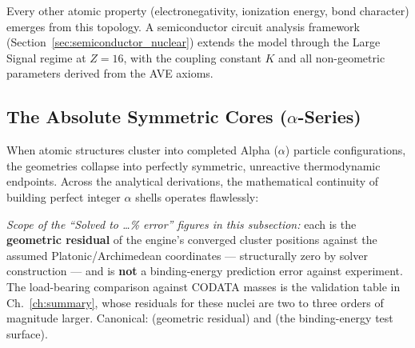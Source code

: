 Every other atomic property (electronegativity, ionization energy, bond character) emerges from this topology. A semiconductor circuit analysis framework (Section~\ref{sec:semiconductor_nuclear}) extends the model through the Large Signal regime at $Z=16$, with the coupling constant $K$ and all non-geometric parameters derived from the AVE axioms.

\subsection{The Absolute Symmetric Cores ($\alpha$-Series)}
When atomic structures cluster into completed Alpha ($\alpha$) particle configurations, the geometries collapse into perfectly symmetric, unreactive thermodynamic endpoints. Across the analytical derivations, the mathematical continuity of building perfect integer $\alpha$ shells operates flawlessly:

\noindent\emph{Scope of the ``Solved to \dots\% error'' figures in this subsection:} each is the \textbf{geometric residual} of the engine's converged cluster positions against the assumed Platonic/Archimedean coordinates --- structurally zero by solver construction --- and is \textbf{not} a binding-energy prediction error against experiment. The load-bearing comparison against CODATA masses is the validation table in Ch.~\ref{ch:summary}, whose residuals for these nuclei are two to three orders of magnitude larger. Canonical:  (geometric residual) and  (the binding-energy test surface).

